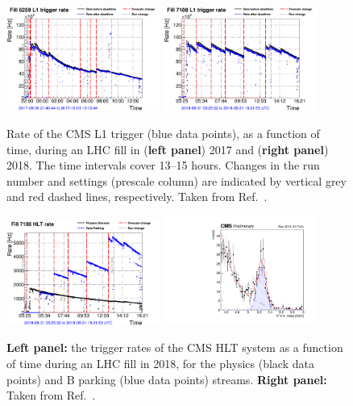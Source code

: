 \documentclass{webofc}
\begin{document}
\begin{figure}[!t]
  \centering
  \includegraphics[width=0.45\textwidth]{CMS-DP-2019-XXX_S02}
  \includegraphics[width=0.45\textwidth]{CMS-DP-2019-XXX_S03}
  \caption{Rate of the CMS L1 trigger (blue data points), as a
    function of time, during an LHC fill in (\textbf{left panel}) 2017
    and (\textbf{right panel}) 2018. The time intervals cover 13--15
    hours. Changes in the run number and settings (prescale column)
    are indicated by vertical grey and red dashed lines,
    respectively. Taken from Ref.~\cite{bpark-dps}.}  
  \label{fig:1}
\end{figure}

\begin{figure}[!t]
  \centering
  \includegraphics[width=0.45\textwidth]{CMS-DP-2019-XXX_S04}
  \includegraphics[width=0.45\textwidth,height=0.3\textwidth]{CMS-DP-2019-XXX_S11}
  \caption{\textbf{Left panel:} the trigger rates of the CMS HLT system as a
    function of time during an LHC fill in 2018, for the physics
    (black data points) and B parking (blue data points) streams. 
    \textbf{Right panel:} Taken from Ref.~\cite{bpark-dps}.}
  \label{fig:2} \end{figure} 
\end{document}
